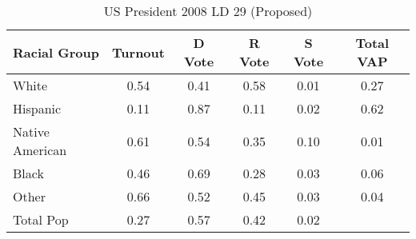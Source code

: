 \begin{table}[htb]
\begin{center}
\caption{US President 2008 LD 29 (Proposed)}
\label{pres08_vap_ld_29}
\begin{tabular}{lccccc}
  \hline
Racial Group & Turnout & D Vote & R Vote & S Vote & Total VAP \\ 
  \hline
White & 0.54 & 0.41 & 0.58 & 0.01 & 0.27 \\ 
  Hispanic & 0.11 & 0.87 & 0.11 & 0.02 & 0.62 \\ 
  Native American & 0.61 & 0.54 & 0.35 & 0.10 & 0.01 \\ 
  Black & 0.46 & 0.69 & 0.28 & 0.03 & 0.06 \\ 
  Other & 0.66 & 0.52 & 0.45 & 0.03 & 0.04 \\ 
  Total Pop & 0.27 & 0.57 & 0.42 & 0.02 &  \\ 
   \hline
\end{tabular}
\end{center}
\end{table}
